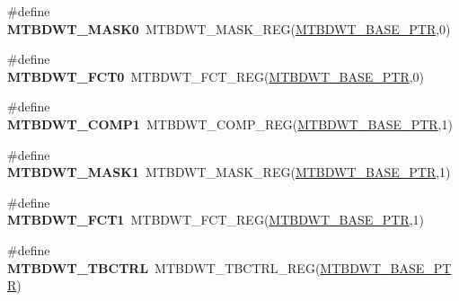 \begin{DoxyCompactItemize}
\#define {\bfseries M\+T\+B\+D\+W\+T\+\_\+\+M\+A\+S\+K0}~M\+T\+B\+D\+W\+T\+\_\+\+M\+A\+S\+K\+\_\+\+R\+EG(\hyperlink{group___m_t_b_d_w_t___peripheral_ga97d048bfb5a11293a38c444b8347ff42}{M\+T\+B\+D\+W\+T\+\_\+\+B\+A\+S\+E\+\_\+\+P\+TR},0)
\item 
\mbox{\label{group___m_t_b_d_w_t___register___accessor___macros_ga12dedaf447e980ce1562d39e22bc7636}} 
\#define {\bfseries M\+T\+B\+D\+W\+T\+\_\+\+F\+C\+T0}~M\+T\+B\+D\+W\+T\+\_\+\+F\+C\+T\+\_\+\+R\+EG(\hyperlink{group___m_t_b_d_w_t___peripheral_ga97d048bfb5a11293a38c444b8347ff42}{M\+T\+B\+D\+W\+T\+\_\+\+B\+A\+S\+E\+\_\+\+P\+TR},0)
\item 
\mbox{\label{group___m_t_b_d_w_t___register___accessor___macros_gad33eb136896be3180b06c5ee963dc607}} 
\#define {\bfseries M\+T\+B\+D\+W\+T\+\_\+\+C\+O\+M\+P1}~M\+T\+B\+D\+W\+T\+\_\+\+C\+O\+M\+P\+\_\+\+R\+EG(\hyperlink{group___m_t_b_d_w_t___peripheral_ga97d048bfb5a11293a38c444b8347ff42}{M\+T\+B\+D\+W\+T\+\_\+\+B\+A\+S\+E\+\_\+\+P\+TR},1)
\item 
\mbox{\label{group___m_t_b_d_w_t___register___accessor___macros_gae894a7aae5ee9a3e87a83d33342451da}} 
\#define {\bfseries M\+T\+B\+D\+W\+T\+\_\+\+M\+A\+S\+K1}~M\+T\+B\+D\+W\+T\+\_\+\+M\+A\+S\+K\+\_\+\+R\+EG(\hyperlink{group___m_t_b_d_w_t___peripheral_ga97d048bfb5a11293a38c444b8347ff42}{M\+T\+B\+D\+W\+T\+\_\+\+B\+A\+S\+E\+\_\+\+P\+TR},1)
\item 
\mbox{\label{group___m_t_b_d_w_t___register___accessor___macros_gad659254c17bdfa6f4d25b8eeccc7eec2}} 
\#define {\bfseries M\+T\+B\+D\+W\+T\+\_\+\+F\+C\+T1}~M\+T\+B\+D\+W\+T\+\_\+\+F\+C\+T\+\_\+\+R\+EG(\hyperlink{group___m_t_b_d_w_t___peripheral_ga97d048bfb5a11293a38c444b8347ff42}{M\+T\+B\+D\+W\+T\+\_\+\+B\+A\+S\+E\+\_\+\+P\+TR},1)
\item 
\mbox{\label{group___m_t_b_d_w_t___register___accessor___macros_gaabe3e4c27fdc7c18a745c1129d06a68d}} 
\#define {\bfseries M\+T\+B\+D\+W\+T\+\_\+\+T\+B\+C\+T\+RL}~M\+T\+B\+D\+W\+T\+\_\+\+T\+B\+C\+T\+R\+L\+\_\+\+R\+EG(\hyperlink{group___m_t_b_d_w_t___peripheral_ga97d048bfb5a11293a38c444b8347ff42}{M\+T\+B\+D\+W\+T\+\_\+\+B\+A\+S\+E\+\_\+\+P\+TR})

\end{DoxyCompactItemize}
